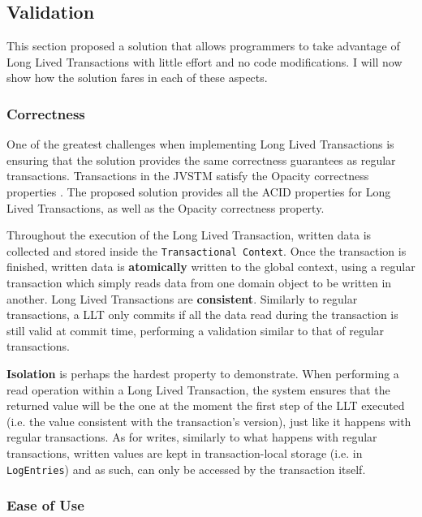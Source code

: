 \documentclass{llncs}
\begin{document}
\subsection{Validation}
\label{sec:validation}

This section proposed a solution that allows programmers to take
advantage of Long Lived Transactions with little effort and no code
modifications. I will now show how the solution fares in each of these
aspects.

\subsubsection{Correctness}

One of the greatest challenges when implementing Long Lived
Transactions is ensuring that the solution provides the same
correctness guarantees as regular transactions. Transactions in the
JVSTM satisfy the Opacity correctness properties
\cite{guerraoui2008correctness}. The proposed solution provides all
the ACID properties for Long Lived Transactions, as well as the
Opacity correctness property.

Throughout the execution of the Long Lived Transaction, written data
is collected and stored inside the \texttt{Transactional Context}. Once
the transaction is finished, written data is {\bf atomically} written
to the global context, using a regular transaction which simply reads
data from one domain object to be written in another.  Long Lived
Transactions are {\bf consistent}. Similarly to regular transactions,
a LLT only commits if all the data read during the transaction is
still valid at commit time, performing a validation similar to that of
regular transactions.

{\bf Isolation} is perhaps the hardest property to demonstrate. When
performing a read operation within a Long Lived Transaction, the
system ensures that the returned value will be the one at the moment
the first step of the LLT executed (i.e. the value consistent with the
transaction's version), just like it happens with regular
transactions.  As for writes, similarly to what happens with regular
transactions, written values are kept in transaction-local storage
(i.e. in \texttt{LogEntries}) and as such, can only be accessed by the
transaction itself.

\subsubsection{Ease of Use}
\end{document}
